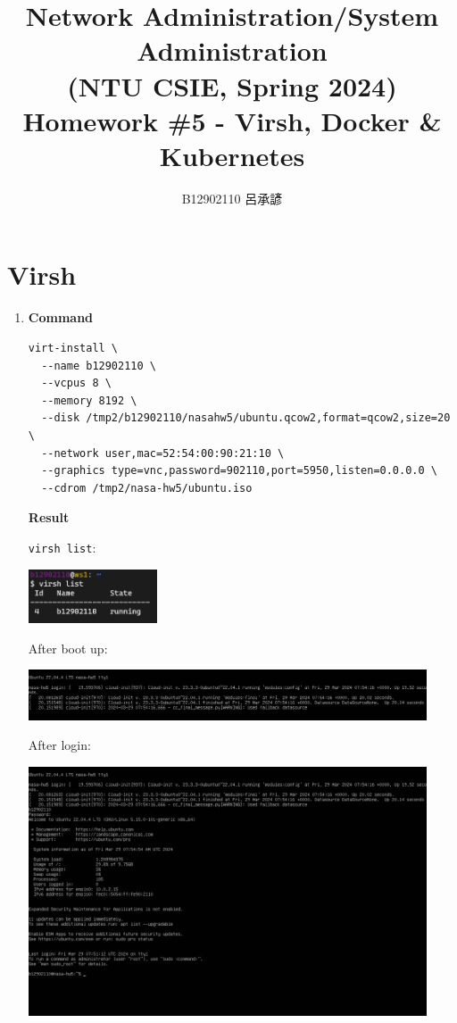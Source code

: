\documentclass[12pt, a4paper]{article}
\title{
  Network Administration/System Administration\\
  (NTU CSIE, Spring 2024)\\
  Homework \#5 - Virsh, Docker \& Kubernetes
}
\author{\Large B12902110 呂承諺}
\begin{document}
  \maketitle
  \section*{Virsh}
  \begin{enumerate}
    \item \textbf{Command}
    \begin{Verbatim}[frame=single]
virt-install \
  --name b12902110 \
  --vcpus 8 \
  --memory 8192 \
  --disk /tmp2/b12902110/nasahw5/ubuntu.qcow2,format=qcow2,size=20 \
  --network user,mac=52:54:00:90:21:10 \
  --graphics type=vnc,password=902110,port=5950,listen=0.0.0.0 \
  --cdrom /tmp2/nasa-hw5/ubuntu.iso
    \end{Verbatim}

    \textbf{Result}

    \verb|virsh list|:

    \includegraphics[width=0.3\textwidth]{1-1_virsh_list.png}

    After boot up:

    \includegraphics[width=0.93\textwidth]{1-1_boot.png}

    \pagebreak
    After login:

    \includegraphics[width=0.93\textwidth]{1-1_login.png}


\end{enumerate}
\end{document}
